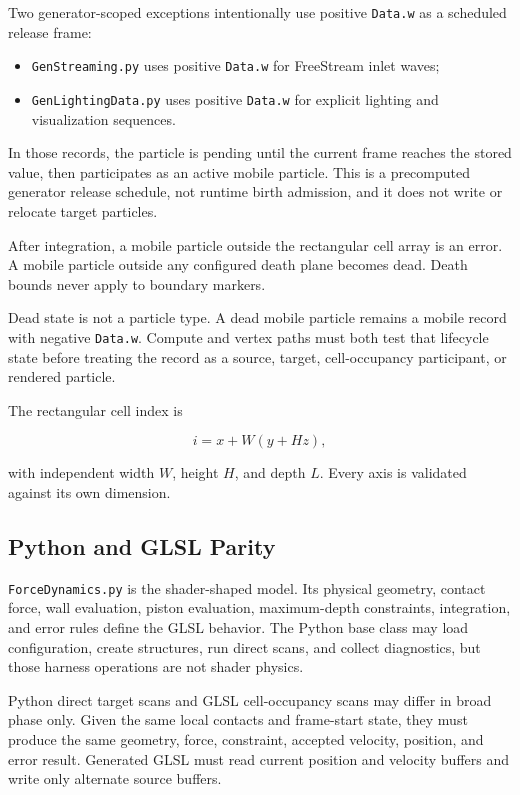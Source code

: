 Two generator-scoped exceptions intentionally use positive \texttt{Data.w} as
a scheduled release frame:
\begin{itemize}
    \item \texttt{GenStreaming.py} uses positive \texttt{Data.w} for FreeStream
          inlet waves;
    \item \texttt{GenLightingData.py} uses positive \texttt{Data.w} for
          explicit lighting and visualization sequences.
\end{itemize}
In those records, the particle is pending until the current frame reaches the
stored value, then participates as an active mobile particle.  This is a
precomputed generator release schedule, not runtime birth admission, and it
does not write or relocate target particles.

After integration, a mobile particle outside the rectangular cell array is an
error.  A mobile particle outside any configured death plane becomes dead.
Death bounds never apply to boundary markers.

Dead state is not a particle type.  A dead mobile particle remains a mobile
record with negative \texttt{Data.w}.  Compute and vertex paths must both test
that lifecycle state before treating the record as a source, target,
cell-occupancy participant, or rendered particle.

The rectangular cell index is

\begin{equation}
i=x+W(y+Hz),
\end{equation}

with independent width \(W\), height \(H\), and depth \(L\).  Every axis is
validated against its own dimension.

\subsection{Python and GLSL Parity}

\texttt{ForceDynamics.py} is the shader-shaped model.  Its physical geometry,
contact force, wall evaluation, piston evaluation, maximum-depth constraints,
integration, and error rules define the GLSL behavior.  The Python base class
may load configuration, create structures, run direct scans, and collect
diagnostics, but those harness operations are not shader physics.

Python direct target scans and GLSL cell-occupancy scans may differ in broad
phase only.  Given the same local contacts and frame-start state, they must
produce the same geometry, force, constraint, accepted velocity, position, and
error result.  Generated GLSL must read current position and velocity buffers
and write only alternate source buffers.

